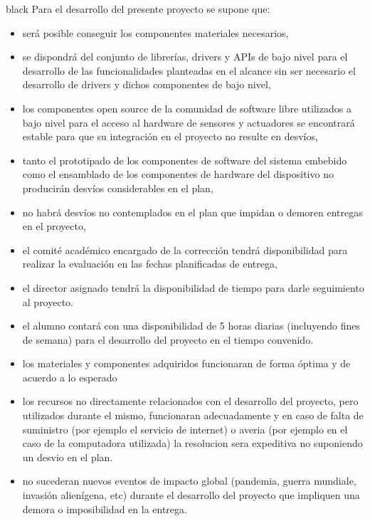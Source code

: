 \documentclass[
11pt, %
codirector, %
]{charter}
\begin{document}
\begin{consigna}{black}
Para el desarrollo del presente proyecto se supone que: 

\begin{itemize}
	\item será posible conseguir los componentes materiales necesarios,
	\item se dispondrá del conjunto de librerías, drivers y APIs de bajo nivel para el desarrollo de las funcionalidades planteadas en el alcance sin ser necesario el desarrollo de drivers y dichos componentes de bajo nivel,
	\item los componentes open source de la comunidad de software libre utilizados a bajo nivel para el acceso al hardware de sensores y actuadores se encontrará estable para que su integración en el proyecto no resulte en desvíos,	
	\item tanto el prototipado de los componentes de software del sistema embebido como el ensamblado de los componentes de hardware del dispositivo no producirán desvíos considerables en el plan,
	\item no habrá desvíos no contemplados en el plan que impidan o demoren entregas en el proyecto,
	\item el comité académico encargado de la corrección tendrá disponibilidad para realizar la evaluación en las fechas planificadas de entrega,
	\item el director asignado tendrá la disponibilidad de tiempo para darle seguimiento al proyecto.
	\item el alumno contará con una disponibilidad de 5 horas diarias (incluyendo fines de semana) para el desarrollo del proyecto en el tiempo convenido.
	\item los materiales y componentes adquiridos funcionaran de forma óptima y de acuerdo a lo esperado
	\item los recursos no directamente relacionados con el desarrollo del proyecto, pero utilizados durante el mismo, funcionaran adecuadamente y en caso de falta de suministro (por ejemplo el servicio de internet) o averia (por ejemplo en el caso de la computadora utilizada) la resolucion sera expeditiva no suponiendo un desvio en el plan.
	\item no sucederan nuevos eventos de impacto global (pandemia, guerra mundiale, invasión alienígena, etc) durante el desarrollo del proyecto que impliquen una demora o imposibilidad en la entrega.
\end{itemize}


\end{consigna}
\end{document}
